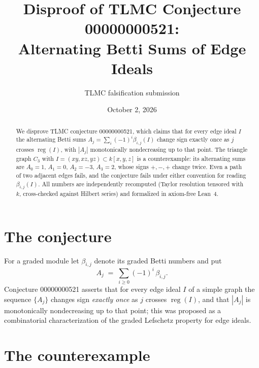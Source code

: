 \documentclass[11pt]{article}
\title{Disproof of TLMC Conjecture 00000000521:\\
Alternating Betti Sums of Edge Ideals}
\author{TLMC falsification submission}
\date{October 2, 2026}
\begin{document}
\maketitle

\begin{abstract}
We disprove TLMC conjecture 00000000521, which claims that for every edge
ideal $I$ the alternating Betti sums $A_j=\sum_i(-1)^i\beta_{i,j}(I)$ change
sign exactly once as $j$ crosses $\operatorname{reg}(I)$, with $|A_j|$
monotonically nondecreasing up to that point. The triangle graph
$C_3$ with $I=(xy,xz,yz)\subset k[x,y,z]$ is a counterexample: its
alternating sums are $A_0=1$, $A_1=0$, $A_2=-3$, $A_3=2$, whose signs
$+,-,+$ change twice. Even a path of two adjacent edges fails, and the
conjecture fails under either convention for reading $\beta_{i,j}(I)$.
All numbers are independently recomputed (Taylor resolution tensored with
$k$, cross-checked against Hilbert series) and formalized in axiom-free
Lean~4.
\end{abstract}

\section{The conjecture}

For a graded module let $\beta_{i,j}$ denote its graded Betti numbers and put
\[
A_j \;=\; \sum_{i\ge 0} (-1)^i\,\beta_{i,j}.
\]
Conjecture 00000000521 asserts that for every edge ideal $I$ of a simple
graph the sequence $\{A_j\}$ changes sign \emph{exactly once} as $j$ crosses
$\operatorname{reg}(I)$, and that $|A_j|$ is monotonically nondecreasing up
to that point; this was proposed as a combinatorial characterization of the
graded Lefschetz property for edge ideals.

\section{The counterexample}
\end{document}
